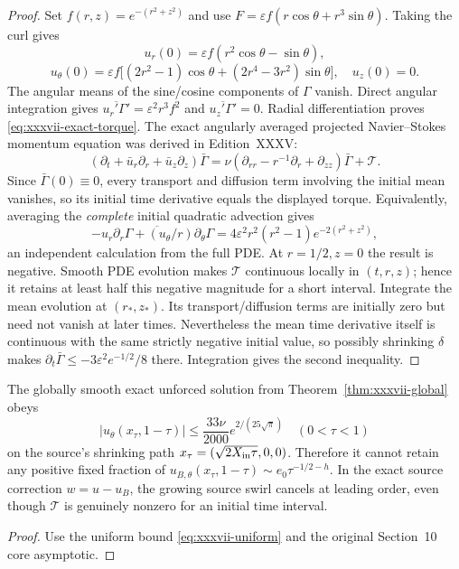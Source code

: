 \begin{proof}
Set $f(r,z)=e^{-(r^2+z^2)}$ and use
$F=\varepsilon f(r\cos\theta+r^3\sin\theta)$.
Taking the curl gives
\[
u_r(0)=\varepsilon f(r^2\cos\theta-\sin\theta),
\]
\[
u_\theta(0)=\varepsilon f\bigl[
(2r^2-1)\cos\theta+
(2r^4-3r^2)\sin\theta\bigr],\quad u_z(0)=0.
\]
The angular means of the sine/cosine components
of $\Gamma$ vanish. Direct angular integration gives
$\overline{u_r'\Gamma'}=\varepsilon^2r^3 f^2$
and $\overline{u_z'\Gamma'}=0$.
Radial differentiation proves
\eqref{eq:xxxvii-exact-torque}.
The exact angularly averaged projected
Navier--Stokes momentum equation was derived
in Edition~XXXV:
\[
(\partial_t+\bar u_r\partial_r+\bar u_z\partial_z)
\bar\Gamma
=\nu(\partial_{rr}-r^{-1}\partial_r+\partial_{zz})
\bar\Gamma+\mathcal T.
\]
Since $\bar\Gamma(0)\equiv0$, every
transport and diffusion term involving the
initial mean vanishes, so its initial
time derivative equals the displayed torque.
Equivalently, averaging the \emph{complete}
initial quadratic advection gives
\[
-\overline{u_r\partial_r\Gamma+
   (u_\theta/r)\partial_\theta\Gamma}
=4\varepsilon^2r^2(r^2-1)e^{-2(r^2+z^2)},
\]
an independent calculation from the full PDE.
At $r=1/2,z=0$ the result is negative.
Smooth PDE evolution makes $\mathcal T$
continuous locally in $(t,r,z)$; hence it
retains at least half this negative magnitude
for a short interval.
Integrate the mean evolution at $(r_*,z_*)$.
Its transport/diffusion terms are initially
zero but need not vanish at later times.
Nevertheless the mean time derivative itself
is continuous with the same strictly negative
initial value, so possibly shrinking $\delta$
makes $\partial_t\bar\Gamma\le
-3\varepsilon^2 e^{-1/2}/8$ there.
Integration gives the second inequality.
\end{proof}

\begin{proposition}
\label{prop:xxxvii-regularity-negative}
The globally smooth exact unforced solution from
Theorem~\ref{thm:xxxvii-global} obeys
\[
|u_\theta(x_\tau,1-\tau)|
\le\frac{33\nu}{2000}e^{2/(25\sqrt\pi)}
\quad(0<\tau<1)
\]
on the source's shrinking path
$x_\tau=(\sqrt{2X_{\rm in}\tau},0,0)$.
Therefore it cannot retain any positive fixed fraction of
$u_{B,\theta}(x_\tau,1-\tau)
\sim e_0\tau^{-1/2-h}$.
In the exact source correction $w=u-u_B$,
the growing source swirl cancels at leading order,
even though $\mathcal T$ is genuinely nonzero
for an initial time interval.
\end{proposition}
\begin{proof}
Use the uniform bound \eqref{eq:xxxvii-uniform}
and the original Section~10 core asymptotic.
\end{proof}

